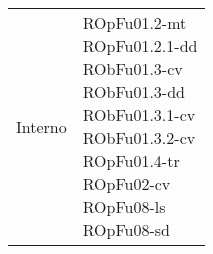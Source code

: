 \begin{center}
\begin{longtable}{|
*{1}{>{\centering\arraybackslash}p{5cm}|}
*{1}{>{\centering\arraybackslash}p{5cm}|}}
{}\\\hline
Interno & \makecell{ROpFu01.2-mt
\\ROpFu01.2.1-dd
\\RObFu01.3-cv
\\RObFu01.3-dd
\\RObFu01.3.1-cv
\\RObFu01.3.2-cv
\\ROpFu01.4-tr
\\ROpFu02-cv
\\ROpFu08-ls
\\ROpFu08-sd
}\\\hline
\end{longtable}
\end{center}
